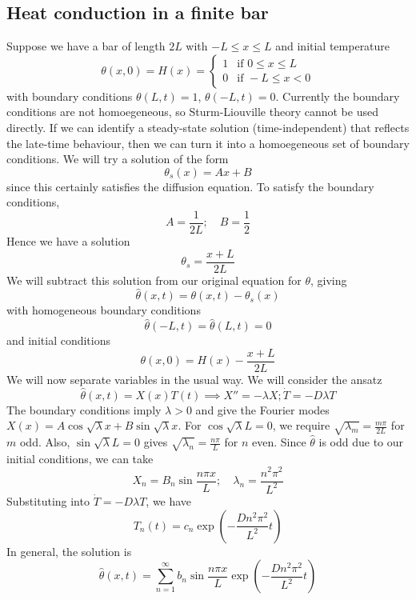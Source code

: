 \subsection{Heat conduction in a finite bar}
Suppose we have a bar of length \( 2L \) with \( -L \leq x \leq L \) and initial temperature
\[
	\theta(x,0) = H(x) = \begin{cases}
		1 & \text{if } 0 \leq x \leq L \\
		0 & \text{if } -L \leq x < 0
	\end{cases}
\]
with boundary conditions \( \theta(L, t) = 1 \), \( \theta(-L, t) = 0 \).
Currently the boundary conditions are not homoegeneous, so Sturm-Liouville theory cannot be used directly.
If we can identify a steady-state solution (time-independent) that reflects the late-time behaviour, then we can turn it into a homoegeneous set of boundary conditions.
We will try a solution of the form
\[
	\theta_s(x) = Ax + B
\]
since this certainly satisfies the diffusion equation.
To satisfy the boundary conditions,
\[
	A = \frac{1}{2L};\quad B = \frac{1}{2}
\]
Hence we have a solution
\[
	\theta_s = \frac{x + L}{2L}
\]
We will subtract this solution from our original equation for \( \theta \), giving
\[
	\hat \theta(x,t) = \theta(x,t) - \theta_s(x)
\]
with homogeneous boundary conditions
\[
	\hat \theta(-L, t) = \hat \theta(L, t) = 0
\]
and initial conditions
\[
	\theta(x,0) = H(x) - \frac{x+L}{2L}
\]
We will now separate variables in the usual way.
We will consider the ansatz
\[
	\hat \theta(x,t) = X(x) T(t) \implies X'' = - \lambda X; \dot T = -D \lambda T
\]
The boundary conditions imply \( \lambda > 0 \) and give the Fourier modes \( X(x) = A \cos \sqrt{\lambda} x + B \sin \sqrt{\lambda} x \).
For \( \cos \sqrt{\lambda} L = 0 \), we require \( \sqrt{\lambda_m} = \frac{m \pi}{2L} \) for \( m \) odd.
Also, \( \sin \sqrt{\lambda} L = 0 \) gives \( \sqrt{\lambda_n} = \frac{n \pi}{L} \) for \( n \) even.
Since \( \hat \theta \) is odd due to our initial conditions, we can take
\[
	X_n = B_n \sin \frac{n \pi x}{L}; \quad \lambda_n = \frac{n^2 \pi^2}{L^2}
\]
Substituting into \( \dot T = -D \lambda T \), we have
\[
	T_n(t) = c_n \exp(-\frac{Dn^2 \pi^2}{L^2} t )
\]
In general, the solution is
\[
	\hat \theta(x,t) = \sum_{n=1}^\infty b_n \sin \frac{n \pi x}{L} \exp(-\frac{Dn^2 \pi^2}{L^2} t )
\]
